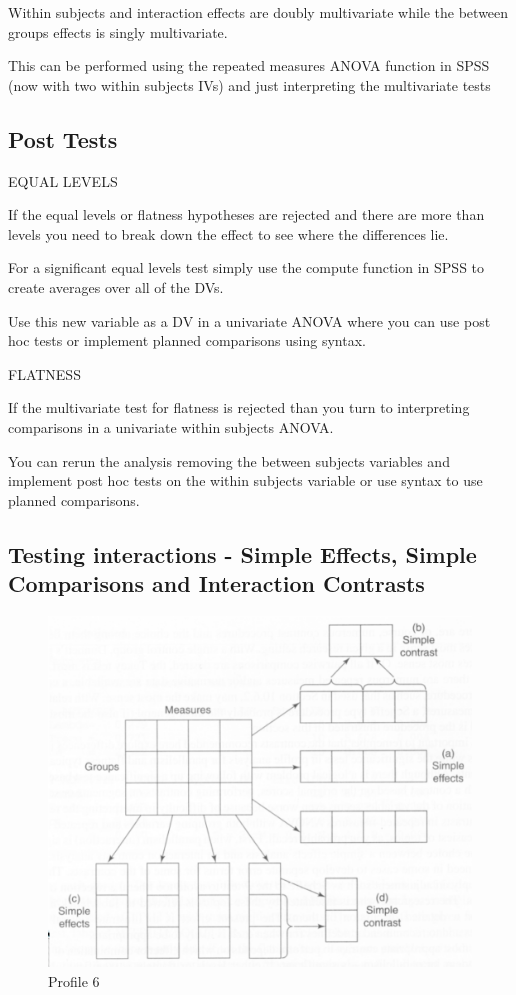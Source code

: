 \documentclass[]{book}
\theoremstyle{definition}
\theoremstyle{definition}
\theoremstyle{definition}
\theoremstyle{remark}
\begin{document}
Within subjects and interaction effects are doubly multivariate while
the between groups effects is singly multivariate.

This can be performed using the repeated measures ANOVA function in SPSS
(now with two within subjects IVs) and just interpreting the
multivariate tests

\subsection{Post Tests}\label{post-tests}

EQUAL LEVELS

If the equal levels or flatness hypotheses are rejected and there are
more than levels you need to break down the effect to see where the
differences lie.

For a significant equal levels test simply use the compute function in
SPSS to create averages over all of the DVs.

Use this new variable as a DV in a univariate ANOVA where you can use
post hoc tests or implement planned comparisons using syntax.

FLATNESS

If the multivariate test for flatness is rejected than you turn to
interpreting comparisons in a univariate within subjects ANOVA.

You can rerun the analysis removing the between subjects variables and
implement post hoc tests on the within subjects variable or use syntax
to use planned comparisons.

\subsection{Testing interactions - Simple Effects, Simple Comparisons
and Interaction
Contrasts}\label{testing-interactions---simple-effects-simple-comparisons-and-interaction-contrasts}

\begin{figure}
\centering
\includegraphics{img/jhprofile6.png}
\caption{Profile 6}
\end{figure}
\end{document}
